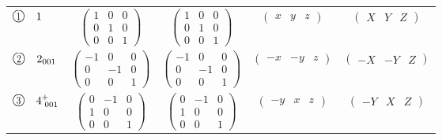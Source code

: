 \documentclass[fleqn,10pt,landscape]{jsarticle}
\begin{document}
\begin{center}
\begin{longtable}{lcccc}
$ {\ooalign{\hfil\resizebox{.8\width}{\height}{1}\hfil\crcr\raise.1ex\hbox{\large$\bigcirc$}}}\quad 1 $ & $ \begin{pmatrix} 1 & 0 & 0 \\ 0 & 1 & 0 \\ 0 & 0 & 1 \end{pmatrix} $ & $ \begin{pmatrix} 1 & 0 & 0 \\ 0 & 1 & 0 \\ 0 & 0 & 1 \end{pmatrix} $ & $ \begin{pmatrix} x & y & z \end{pmatrix} $ & $ \begin{pmatrix} X & Y & Z \end{pmatrix} $ \\
$ {\ooalign{\hfil\resizebox{.8\width}{\height}{2}\hfil\crcr\raise.1ex\hbox{\large$\bigcirc$}}}\quad 2{}_{001} $ & $ \begin{pmatrix} -1 & 0 & 0 \\ 0 & -1 & 0 \\ 0 & 0 & 1 \end{pmatrix} $ & $ \begin{pmatrix} -1 & 0 & 0 \\ 0 & -1 & 0 \\ 0 & 0 & 1 \end{pmatrix} $ & $ \begin{pmatrix} - x & - y & z \end{pmatrix} $ & $ \begin{pmatrix} - X & - Y & Z \end{pmatrix} $ \\
$ {\ooalign{\hfil\resizebox{.8\width}{\height}{3}\hfil\crcr\raise.1ex\hbox{\large$\bigcirc$}}}\quad 4^{+}_{\,\,001} $ & $ \begin{pmatrix} 0 & -1 & 0 \\ 1 & 0 & 0 \\ 0 & 0 & 1 \end{pmatrix} $ & $ \begin{pmatrix} 0 & -1 & 0 \\ 1 & 0 & 0 \\ 0 & 0 & 1 \end{pmatrix} $ & $ \begin{pmatrix} - y & x & z \end{pmatrix} $ & $ \begin{pmatrix} - Y & X & Z \end{pmatrix} $ \\

\end{longtable}
\end{center}
\end{document}
